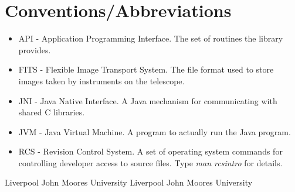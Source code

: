 \documentclass[10pt,a4paper]{article}
\begin{document}
\section{Conventions/Abbreviations}
\begin{itemize}
\item API - Application Programming Interface. The set of routines the library provides.
\item FITS - Flexible Image Transport System. The file format used to store images taken by instruments
	on the telescope.
\item JNI - Java Native Interface. A Java mechanism for communicating with shared C libraries.
\item JVM - Java Virtual Machine. A program to actually run the Java program.
\item RCS - Revision Control System. A set of operating system commands for controlling developer access to
source files. Type {\em man rcsintro} for details.
\end{itemize}

\begin{thebibliography}{99}
Liverpool John Moores University 
Liverpool John Moores University 
\end{thebibliography}
\end{document}
